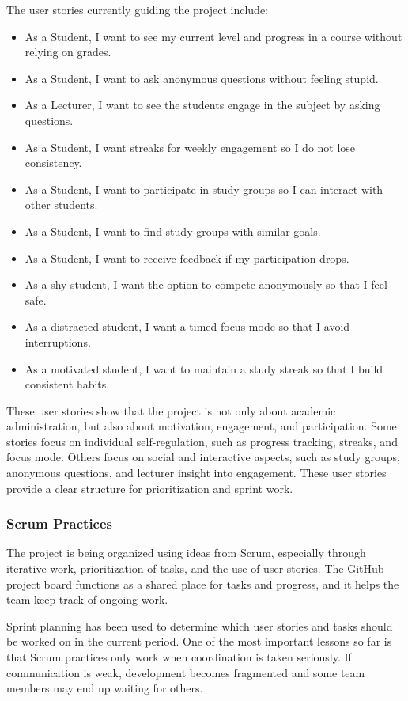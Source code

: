 The user stories currently guiding the project include:

\begin{itemize}[leftmargin=1.5em]
    \item As a Student, I want to see my current level and progress in a course without relying on grades.
    \item As a Student, I want to ask anonymous questions without feeling stupid.
    \item As a Lecturer, I want to see the students engage in the subject by asking questions.
    \item As a Student, I want streaks for weekly engagement so I do not lose consistency.
    \item As a Student, I want to participate in study groups so I can interact with other students.
    \item As a Student, I want to find study groups with similar goals.
    \item As a Student, I want to receive feedback if my participation drops.
    \item As a shy student, I want the option to compete anonymously so that I feel safe.
    \item As a distracted student, I want a timed focus mode so that I avoid interruptions.
    \item As a motivated student, I want to maintain a study streak so that I build consistent habits.
\end{itemize}

These user stories show that the project is not only about academic administration, but also about motivation, engagement, and participation. Some stories focus on individual self-regulation, such as progress tracking, streaks, and focus mode. Others focus on social and interactive aspects, such as study groups, anonymous questions, and lecturer insight into engagement.
These user stories provide a clear structure for prioritization and sprint work.

\subsubsection{Scrum Practices}
The project is being organized using ideas from Scrum, especially through iterative work, prioritization of tasks,
and the use of user stories.
The GitHub project board functions as a shared place for tasks and progress, and it helps the team keep track of ongoing work.

Sprint planning has been used to determine which user stories and tasks should be worked on in the current period.
One of the most important lessons so far is that Scrum practices only work when coordination is taken seriously.
If communication is weak, development becomes fragmented and some team members may end up waiting for others.

